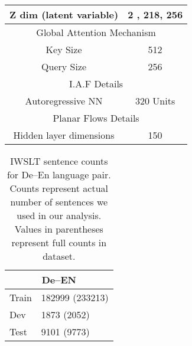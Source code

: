\begin{table}[]
\begin{tabular}{|c|c|}
		Z dim (latent variable)          & 2 , 218, 256        \\ \hline
		\multicolumn{2}{|c|}{Global Attention Mechanism}       \\ \hline
		Key Size                         & 512                 \\ \hline
		Query Size                       & 256                 \\ \hline
		\multicolumn{2}{|c|}{I.A.F Details}                    \\ \hline
		Autoregressive NN                & 320 Units           \\ \hline
		\multicolumn{2}{|c|}{Planar Flows Details}             \\ \hline
		Hidden layer dimensions          & 150                 \\ \hline
	\end{tabular}
\end{table}



\begin{table}[]
	\caption{IWSLT sentence counts for De--En language pair. Counts represent actual number of sentences we used in our analysis. Values in parentheses represent full counts in dataset.} 
	\center
	\begin{tabular}{|l|l|}
		\hline
		\multicolumn{2}{|c|}{De--EN} \\ \hline
		Train    & 182999 (233213)   \\ \hline
		Dev      & 1873 (2052)       \\ \hline
		Test     & 9101  (9773)      \\ \hline
	\end{tabular}
\end{table}